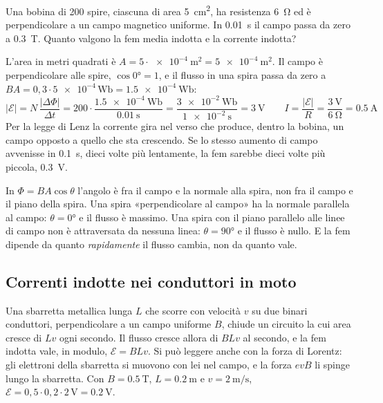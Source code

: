\begin{esempio}
Una bobina di 200 spire, ciascuna di area \SI{5}{\centi\metre\squared}, ha resistenza \SI{6}{\ohm} ed è perpendicolare a un campo magnetico uniforme. In \SI{0,01}{\second} il campo passa da zero a \SI{0,3}{\tesla}. Quanto valgono la fem media indotta e la corrente indotta?

L'area in metri quadrati è $A = 5 \cdot \SI{e-4}{\metre\squared} = \SI{5e-4}{\metre\squared}$. Il campo è perpendicolare alle spire, $\cos\ang{0} = 1$, e il flusso in una spira passa da zero a $BA = 0{,}3 \cdot \num{5e-4}\,\si{\weber} = \SI{1,5e-4}{\weber}$:
\[
  |\mathcal E| = N\,\frac{|\Delta\Phi|}{\Delta t} = 200 \cdot \frac{\SI{1,5e-4}{\weber}}{\SI{0,01}{\second}} = \frac{\SI{3e-2}{\weber}}{\SI{1e-2}{\second}} = \SI{3}{\volt}
  \qquad
  I = \frac{|\mathcal E|}{R} = \frac{\SI{3}{\volt}}{\SI{6}{\ohm}} = \SI{0,5}{\ampere}
\]
Per la legge di Lenz la corrente gira nel verso che produce, dentro la bobina, un campo opposto a quello che sta crescendo. Se lo stesso aumento di campo avvenisse in \SI{0,1}{\second}, dieci volte più lentamente, la fem sarebbe dieci volte più piccola, \SI{0,3}{\volt}.
\end{esempio}

\begin{attenzione}
In $\Phi = BA\cos\theta$ l'angolo è fra il campo e la normale alla spira, non fra il campo e il piano della spira. Una spira «perpendicolare al campo» ha la normale parallela al campo: $\theta = \ang{0}$ e il flusso è massimo. Una spira con il piano parallelo alle linee di campo non è attraversata da nessuna linea: $\theta = \ang{90}$ e il flusso è nullo. E la fem dipende da quanto \emph{rapidamente} il flusso cambia, non da quanto vale.
\end{attenzione}



\subsection{Correnti indotte nei conduttori in moto}

Una sbarretta metallica lunga $L$ che scorre con velocità $v$ su due binari conduttori, perpendicolare a un campo uniforme $B$, chiude un circuito la cui area cresce di $Lv$ ogni secondo. Il flusso cresce allora di $BLv$ al secondo, e la fem indotta vale, in modulo, $\mathcal E = BLv$. Si può leggere anche con la forza di Lorentz: gli elettroni della sbarretta si muovono con lei nel campo, e la forza $evB$ li spinge lungo la sbarretta. Con $B = \SI{0,5}{\tesla}$, $L = \SI{0,2}{\metre}$ e $v = \SI{2}{\metre\per\second}$, $\mathcal E = 0{,}5 \cdot 0{,}2 \cdot 2\,\si{\volt} = \SI{0,2}{\volt}$.

